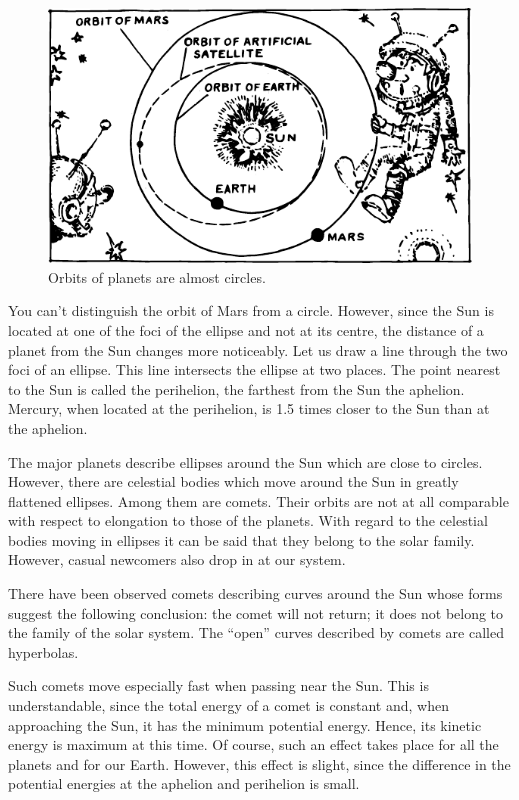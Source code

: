  \begin{figure}[!ht]
 \centering
 \includegraphics[width=\textwidth]{figures/fig-6-6.pdf}
 \caption{Orbits of planets are almost circles.}
 \label{fig-6-6}
 \end{figure}

You can't distinguish the orbit of Mars from a circle.
However, since the Sun is located at one of the foci
of the ellipse and not at its centre, the distance of a planet
from the Sun changes more noticeably. Let us draw a line
through the two foci of an ellipse. This line intersects
the ellipse at two places. The point nearest to the Sun
is called the perihelion, the farthest from the Sun the
aphelion. Mercury, when located at the perihelion, is
1.5 times closer to the Sun than at the aphelion.

The major planets describe ellipses around the Sun
which are close to circles. However, there are celestial
bodies which move around the Sun in greatly flattened
ellipses. Among them are comets. Their orbits are not
at all comparable with respect to elongation to those
of the planets. With regard to the celestial bodies moving
in ellipses it can be said that they belong to the solar
family. However, casual newcomers also drop in at our
system.

There have been observed comets describing curves
around the Sun whose forms suggest the following conclusion: the comet will not return; it does not belong to the
family of the solar system. The ``open'' curves described
by comets are called hyperbolas.

Such comets move especially fast when passing near
the Sun. This is understandable, since the total energy
of a comet is constant and, when approaching the Sun,
it has the minimum potential energy. Hence, its kinetic
energy is maximum at this time. Of course, such an
effect takes place for all the planets and for our Earth.
However, this effect is slight, since the difference in the
potential energies at the aphelion and perihelion is small.



